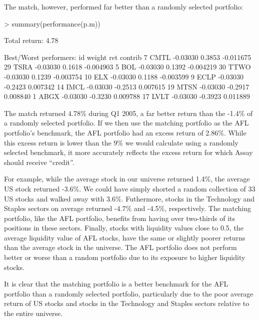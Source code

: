 \documentclass{article}
\begin{document}
The match, however, performed far better than a randomly selected portfolio:

\begin{Schunk}
\begin{Sinput}
> summary(performance(p.m))
\end{Sinput}
\begin{Soutput}
Total return:  4.78 % 

Best/Worst performers:
     id   weight     ret   contrib
7  CMTL -0.03030  0.3853 -0.011675
29 TSRA -0.03030  0.1618 -0.004903
5   BOL -0.03030  0.1392 -0.004219
30 TTWO -0.03030  0.1239 -0.003754
10  ELX -0.03030  0.1188 -0.003599
9  ECLP -0.03030 -0.2423  0.007342
14 IMCL -0.03030 -0.2513  0.007615
19 MTSN -0.03030 -0.2917  0.008840
1  ABGX -0.03030 -0.3230  0.009788
17 LVLT -0.03030 -0.3923  0.011889
\end{Soutput}
\end{Schunk}

The match returned 4.78\% during Q1 2005, a far better return than the
-1.4\% of a randomly selected portfolio.  If we then use the matching
portfolio as the AFL portfolio's benchmark, the AFL portfolio had an
excess return of 2.86\%.  While this excess return is lower than the
9\% we would calculate using a randomly selected benchmark, it more
accurately reflects the excess return for which Assay should receive
``credit''.

For example, while the average stock in our universe returned 1.4\%,
the average US stock returned -3.6\%.  We could have simply shorted a
random collection of 33 US stocks and walked away with 3.6\%.
Futhermore, stocks in the Technology and Staples sectors on average
returned -4.7\% and -4.5\%, respectively.  The matching portfolio,
like the AFL portfolio, benefits from having over two-thirds of its
positions in these sectors.  Finally, stocks with liquidity values
close to 0.5, the average liquidity value of AFL stocks, have the same
or slightly poorer returns than the average stock in the universe.
The AFL portfolio does not perform better or worse than a random
portfolio due to its exposure to higher liquidity stocks.

It is clear that the matching portfolio is a better benchmark for the
AFL portfolio than a randomly selected portfolio, particularly due to
the poor average return of US stocks and stocks in the Technology and
Staples sectors relative to the entire universe.


\end{document}
